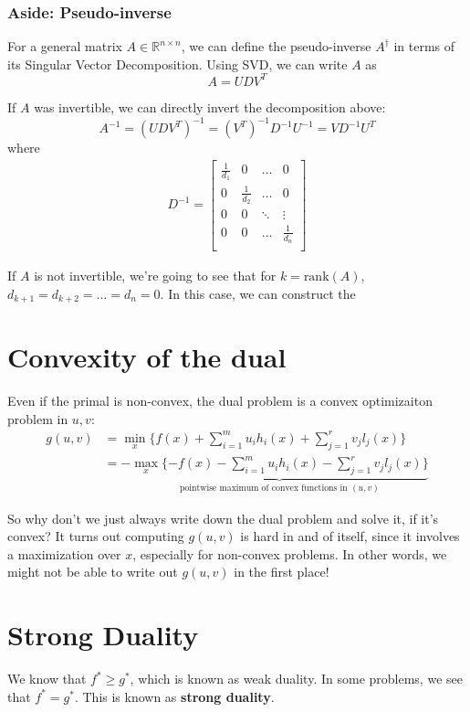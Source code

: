 \documentclass[11pt]{article}
\newcommand{\R}{\mathbb{R}}
\begin{document}
\subsubsection{Aside: Pseudo-inverse}
For a general matrix $A \in \R^{n\times n}$, we can define the pseudo-inverse
$A^{\dagger}$ in terms of its Singular Vector Decomposition. Using SVD, we can
write $A$ as
\[ A = U D V^T \]

If $A$ was invertible, we can directly invert the decomposition above:
\[ A^{-1} = (U D V^T)^{-1} = (V^T)^{-1} D^{-1} U^{-1} = V D^{-1} U^T \]
where
\begin{align*}
D^{-1} = \begin{bmatrix}
\frac{1}{d_1} & 0 & \dots & 0 \\
0 & \frac{1}{d_2} & \dots & 0 \\
0 & 0 & \ddots & \vdots \\
0 & 0 & \dots & \frac{1}{d_n} \\
\end{bmatrix}
\end{align*}

If $A$ is not invertible, we're going to see that for $k = \text{rank}(A)$,
$d_{k+1} = d_{k+2} = \dots = d_n = 0$. In this case, we can construct the

\section{Convexity of the dual}

Even if the primal is non-convex, the dual problem is a convex optimizaiton
problem in $u, v$:
\begin{align*}
g(u, v) &= \min_x \{f(x) + \sum_{i=1}^m u_i h_i(x) + \sum_{j=1}^r v_j l_j(x) \} \\
        &= - \underbrace{\max_x \{-f(x) - \sum_{i=1}^m u_i h_i(x) - \sum_{j=1}^r v_j l_j(x) \}}_{\text{pointwise maximum of convex functions in } (u, v)}
\end{align*}

So why don't we just always write down the dual problem and solve it, if it's
convex? It turns out computing $g(u, v)$ is hard in and of itself, since it
involves a maximization over $x$, especially for non-convex problems. In other
words, we might not be able to write out $g(u, v)$ in the first place!

\section{Strong Duality}
We know that $f^* \geq g^*$, which is known as weak duality. In some problems, we
see that $f^* = g^*$. This is known as \textbf{strong duality}.
\end{document}
